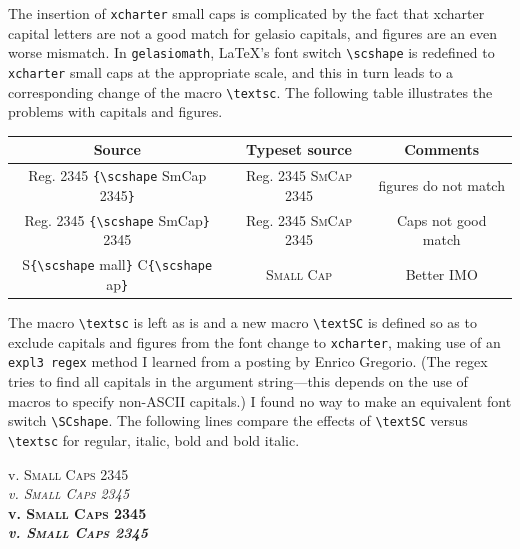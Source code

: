 \documentclass[11pt]{article}
\begin{document}
 

The insertion of {\tt xcharter} small caps is complicated by the fact that xcharter capital letters are not a good match for gelasio capitals, and figures are an even worse mismatch. In {\tt gelasiomath}, LaTeX's font switch \verb|\scshape| is redefined to {\tt xcharter} small caps at the appropriate scale, and this in turn leads to a corresponding change of the macro \verb|\textsc|. The following table illustrates the problems with capitals and figures.

\begin{center}
  \begin{tabular}{@{} ccc @{}}
    \toprule
    Source & Typeset source & Comments \\ 
    \midrule
    Reg. 2345 \verb|{\scshape| SmCap 2345\verb|}|& Reg. 2345 {\scshape SmCap 2345} & figures do not match \\ 
    Reg. 2345 \verb|{\scshape| SmCap\verb|}| 2345& Reg. 2345 {\scshape SmCap} 2345 & Caps not good match  \\ 
     S\verb|{\scshape| mall\verb|}| C\verb|{\scshape| ap\verb|}|& S{\scshape mall} C{\scshape ap}& Better IMO\\ 
    \bottomrule
  \end{tabular}
\end{center}

The macro \verb|\textsc| is left as is and a new macro \verb|\textSC| is defined so as to exclude capitals and figures from the font change to {\tt xcharter}, making use of an {\tt expl3 regex} method I learned from a posting by Enrico Gregorio. (The regex tries to find all capitals in the argument string---this depends on the use of macros to specify non-ASCII capitals.) I found no way to make an equivalent font switch \verb|\SCshape|. The following lines compare the effects of \verb|\textSC| versus \verb|\textsc| for regular, italic, bold and bold italic.


 v. \textsc{Small Caps 2345}\\
{\itshape {}  v. \textsc{Small  Caps 2345}}\\
{\bfseries {}  v. \textsc{Small  Caps 2345}}\\
{\bfseries\itshape {} v. \textsc{Small  Caps 2345}}
\end{document}
